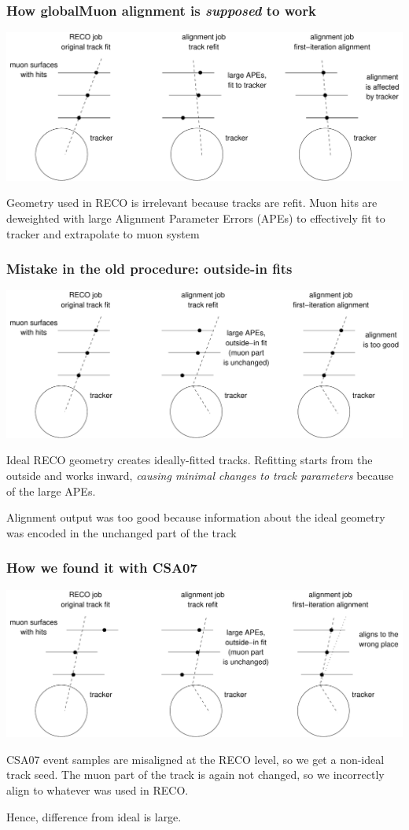 \documentclass[compress]{beamer}
\begin{document}
\begin{frame}
\frametitle{How globalMuon alignment is {\it supposed} to work}

\includegraphics[width=\linewidth]{premistake.pdf}

\vfill Geometry used in RECO is irrelevant because tracks are refit.
Muon hits are deweighted with large Alignment Parameter Errors (APEs) to
effectively fit to tracker and extrapolate to muon system
\end{frame}

\begin{frame}
\frametitle{Mistake in the old procedure: outside-in fits}

\includegraphics[width=\linewidth]{mistake.pdf}

\vfill Ideal RECO geometry creates ideally-fitted tracks.  Refitting
starts from the outside and works inward, {\it causing minimal changes
to track parameters} because of the large APEs.

\vfill Alignment output was too good because information about the
ideal geometry was encoded in the unchanged part of the track
\end{frame}

\begin{frame}
\frametitle{How we found it with CSA07}

\includegraphics[width=\linewidth]{mistake2.pdf}

\vfill CSA07 event samples are misaligned at the RECO level, so we get
a non-ideal track seed.  The muon part of the track is again not
changed, so we incorrectly align to whatever was used in RECO.

\vfill Hence, difference from ideal is large.
\end{frame}
\end{document}
